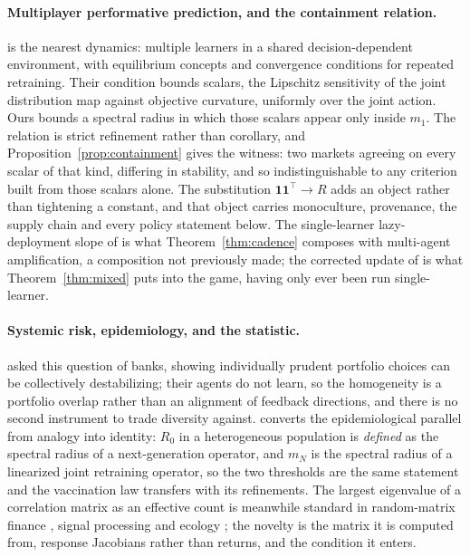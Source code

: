 \documentclass{article}
\theoremstyle{plain}
\theoremstyle{definition}
\newcommand{\mN}{m_N}
\begin{document}
\paragraph{Multiplayer performative prediction, and the containment relation.}
\citet{narang2023} is the nearest dynamics: multiple learners in a shared decision-dependent environment, with equilibrium concepts and convergence conditions for repeated retraining. Their condition bounds scalars, the Lipschitz sensitivity of the joint distribution map against objective curvature, uniformly over the joint action. Ours bounds a spectral radius in which those scalars appear only inside $m_1$. The relation is strict refinement rather than corollary, and Proposition~\ref{prop:containment} gives the witness: two markets agreeing on every scalar of that kind, differing in stability, and so indistinguishable to any criterion built from those scalars alone. The substitution $\mathbf{1}\mathbf{1}^{\top}\!\to R$ adds an object rather than tightening a constant, and that object carries monoculture, provenance, the supply chain and every policy statement below. The single-learner lazy-deployment slope of \citet{mendlerdunner2020} is what Theorem~\ref{thm:cadence} composes with multi-agent amplification, a composition not previously made; the corrected update of \citet{izzo2021} is what Theorem~\ref{thm:mixed} puts into the game, having only ever been run single-learner.

\paragraph{Systemic risk, epidemiology, and the statistic.}
\citet{beale2011} asked this question of banks, showing individually prudent portfolio choices can be collectively destabilizing; their agents do not learn, so the homogeneity is a portfolio overlap rather than an alignment of feedback directions, and there is no second instrument to trade diversity against. \citet{diekmann1990} converts the epidemiological parallel from analogy into identity: $R_0$ in a heterogeneous population is \emph{defined} as the spectral radius of a next-generation operator, and $\mN$ is the spectral radius of a linearized joint retraining operator, so the two thresholds are the same statement and the vaccination law transfers with its refinements. The largest eigenvalue of a correlation matrix as an effective count is meanwhile standard in random-matrix finance \citep{laloux1999,plerou2002}, signal processing \citep{roy2007} and ecology \citep{hill1973}; the novelty is the matrix it is computed from, response Jacobians rather than returns, and the condition it enters.
\end{document}
